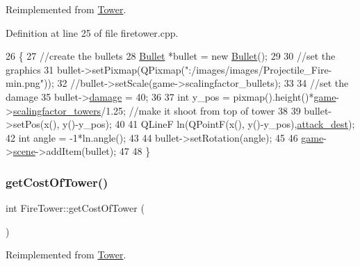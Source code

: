 Reimplemented from \hyperlink{class_tower_aa0c9c780f48cffacd3da6877f5d4fdc2}{Tower}.



Definition at line 25 of file firetower.\+cpp.


\begin{DoxyCode}
26 \{
27     \textcolor{comment}{//create the bullets}
28     \hyperlink{class_bullet}{Bullet} *bullet = \textcolor{keyword}{new} \hyperlink{class_bullet}{Bullet}();
29 
30     \textcolor{comment}{//set the graphics}
31     bullet->setPixmap(QPixmap(\textcolor{stringliteral}{":/images/images/Projectile\_Fire-min.png"}));
32     \textcolor{comment}{//bullet->setScale(game->scalingfactor\_bullets);}
33 
34     \textcolor{comment}{//set the damage}
35     bullet->\hyperlink{class_bullet_a733d2ebbf9143c9ca68d3eb7e14121d0}{damage} = 40;
36 
37     \textcolor{keywordtype}{int} y\_pos = pixmap().height()*\hyperlink{firetower_8cpp_a58bdb5643d0814ac4e697a1564b79b70}{game}->\hyperlink{class_game_a6c1ca48f17f6934432d01bfa7f762a04}{scalingfactor\_towers}/1.25; \textcolor{comment}{//make it shoot
       from top of tower}
38 
39     bullet->setPos(x(), y()-y\_pos);
40 
41     QLineF ln(QPointF(x(), y()-y\_pos),\hyperlink{class_tower_a2b3e8ab90ccceed1fa3a667db80c2c06}{attack\_dest});
42     \textcolor{keywordtype}{int} angle = -1*ln.angle();
43 
44     bullet->setRotation(angle);
45 
46     \hyperlink{firetower_8cpp_a58bdb5643d0814ac4e697a1564b79b70}{game}->\hyperlink{class_game_a8119e3b9a632906c6808fa294b46a92a}{scene}->addItem(bullet);
47 
48 \}
\end{DoxyCode}
\mbox{\label{class_fire_tower_a74be102e9bb0871f19fb55b434e2b6d7}} 
\subsubsection{\texorpdfstring{get\+Cost\+Of\+Tower()}{getCostOfTower()}}
{\footnotesize\ttfamily int Fire\+Tower\+::get\+Cost\+Of\+Tower (\begin{DoxyParamCaption}{ }\end{DoxyParamCaption})\hspace{0.3cm}{\ttfamily [virtual]}}



Reimplemented from \hyperlink{class_tower_ae1d3f44d0149c8146ccf6b262a52ddad}{Tower}.



